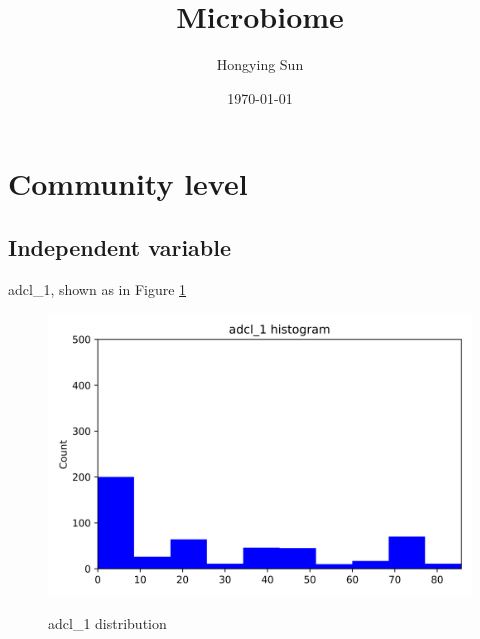 \documentclass{article}
\title{Microbiome}
\author{Hongying Sun
	}
\date{\today}
\begin{document}
\maketitle

\section{Community level}
\subsection{Independent variable}
adcl_1, shown as in Figure \ref{adcl_1-communitylevel}
\begin{figure}[htbp]
	\centering
	\includegraphics[width=\textwidth, keepaspectratio]{adcl_1-communitylevel.png}\\
	\caption{adcl_1 distribution}
	\label{adcl_1-communitylevel}
\end{figure}
\end{document}
